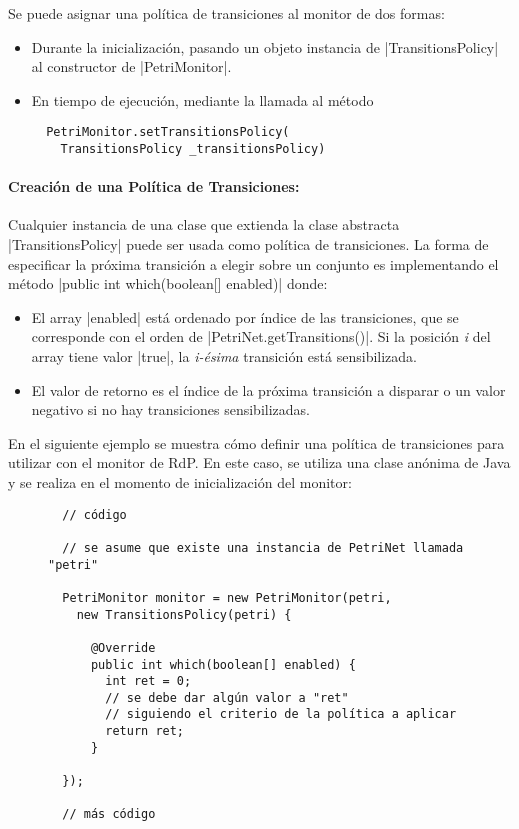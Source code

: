 Se puede asignar una política de transiciones al monitor de dos formas:

\begin{itemize}
    \item Durante la inicialización, pasando un objeto instancia de
    |TransitionsPolicy| al constructor de |PetriMonitor|.
    \item En tiempo de ejecución, mediante la llamada al método\\ {
    \begin{verbatim}
  PetriMonitor.setTransitionsPolicy(
    TransitionsPolicy _transitionsPolicy)
    \end{verbatim}
    }
\end{itemize}

\paragraph{Creación de una Política de Transiciones:}
Cualquier instancia de una clase que extienda la clase abstracta
|TransitionsPolicy| puede ser usada como política de transiciones.
La forma de especificar la próxima transición a elegir sobre un conjunto es
implementando el método |public int which(boolean[] enabled)| donde:
\begin{itemize}
    \item El array |enabled| está ordenado por índice de las
    transiciones, que se corresponde con el orden de
    |PetriNet.getTransitions()|. Si la posición \textit{i} del array
    tiene valor |true|, la \textit{i-ésima} transición está
    sensibilizada.
    \item El valor de retorno es el índice de la próxima transición a disparar
    o un valor negativo si no hay transiciones sensibilizadas.
\end{itemize}

En el siguiente ejemplo se muestra cómo definir una política de transiciones
para utilizar con el monitor de RdP. En este caso, se utiliza una clase anónima
de Java y se realiza en el momento de inicialización del monitor:

\begin{figure}[H]
\centering
\begin{verbatim}
  // código
  
  // se asume que existe una instancia de PetriNet llamada "petri"
  
  PetriMonitor monitor = new PetriMonitor(petri,
    new TransitionsPolicy(petri) {

      @Override
      public int which(boolean[] enabled) {
        int ret = 0;
        // se debe dar algún valor a "ret"
        // siguiendo el criterio de la política a aplicar
        return ret;
      }

  });
  
  // más código
\end{verbatim}
\end{figure}

